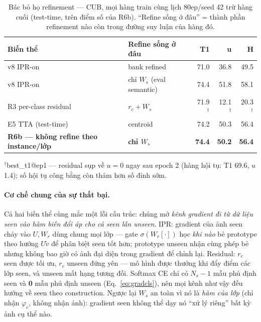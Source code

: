 \documentclass[10pt,twocolumn,letterpaper]{article}
\newcommand{\vtilde}{\tilde{v}}
\begin{document}
\begin{table}[t]
\centering
\caption{Bác bỏ họ refinement — CUB, mọi hàng train cùng lịch 80ep/seed 42 trừ hàng cuối (test-time, trên điểm số của R6b). ``Refine sống ở đâu'' = thành phần refinement nào còn trong đường suy luận của hàng đó.}
\label{tab:refine-reject}
\small
\begin{tabular}{llrrr}
\toprule
Biến thể & Refine sống ở đâu & T1 & u & H \\
\midrule
v8 IPR-on & bank refined & 71.0 & 36.8 & 49.5 \\
v8 IPR-on & chỉ $W_s$ (eval semantic) & 74.4 & 51.8 & 58.1 \\
R3 per-class residual & $r_c{+}W_s$ & 71.9$^{\dagger}$ & 12.1$^{\dagger}$ & 20.3$^{\dagger}$ \\
E5 TTA (test-time) & centroid & 74.2 & 50.3 & 56.4 \\
\midrule
\textbf{R6b — không refine theo instance/lớp} & \textbf{chỉ $W_s$} & \textbf{74.4} & \textbf{50.2} & \textbf{56.4} \\
\bottomrule
\end{tabular}

\raggedright\footnotesize $^{\dagger}$best\_t1@ep1 — residual sụp về $u{=}0$ ngay sau epoch 2 (hàng hội tụ: T1 69.6, $u$ 1.4); số hội tụ công bằng còn thảm hơn số đỉnh sớm.
\end{table}

\paragraph{Cơ chế chung của sự thất bại.}
Cả hai biến thể cùng mắc một lỗi cấu trúc: chúng mở \emph{kênh gradient đi từ dữ liệu seen vào hàm biến đổi áp cho cả seen lẫn unseen}. IPR: gradient của ảnh seen chảy vào $U, W_r$ dùng chung mọi lớp — gate $\sigma(W_r[\cdot])$ học \emph{khi nào} bẻ prototype theo hướng $U\vtilde$ để phân biệt seen tốt hơn; prototype unseen nhận cùng phép bẻ nhưng không bao giờ có ảnh đại diện trong gradient để chỉnh lại. Residual: $r_c$ seen được tối ưu, $r_c$ unseen đứng yên — mô hình được thưởng khi đẩy điểm các lớp seen, và unseen mất hạng tương đối. Softmax CE chỉ có $N_s{-}1$ mẫu phủ định seen và \textbf{0} mẫu phủ định unseen (Eq.~\eqref{eq:gradcls}), nên mọi kênh như vậy đều hướng về seen theo construction. Ngược lại $W_s$ an toàn vì nó là \emph{hàm của lớp} (chỉ nhận $\varphi_c$, không nhận ảnh): gradient seen không thể dạy nó ``xử lý riêng'' bất kỳ ảnh cụ thể nào.
\end{document}
